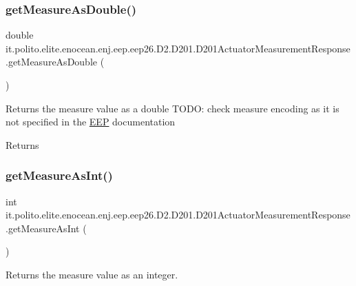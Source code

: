 \subsubsection{\texorpdfstring{get\+Measure\+As\+Double()}{getMeasureAsDouble()}}
{\footnotesize\ttfamily double it.\+polito.\+elite.\+enocean.\+enj.\+eep.\+eep26.\+D2.\+D201.\+D201\+Actuator\+Measurement\+Response.\+get\+Measure\+As\+Double (\begin{DoxyParamCaption}{ }\end{DoxyParamCaption})}

Returns the measure value as a double T\+O\+DO\+: check measure encoding as it is not specified in the \hyperlink{classit_1_1polito_1_1elite_1_1enocean_1_1enj_1_1eep_1_1_e_e_p}{E\+EP} documentation

\begin{DoxyReturn}{Returns}

\end{DoxyReturn}
\hypertarget{classit_1_1polito_1_1elite_1_1enocean_1_1enj_1_1eep_1_1eep26_1_1_d2_1_1_d201_1_1_d201_actuator_measurement_response_ac9c226fb78f0b6fd30a0e4dd7daf32ac}{}\label{classit_1_1polito_1_1elite_1_1enocean_1_1enj_1_1eep_1_1eep26_1_1_d2_1_1_d201_1_1_d201_actuator_measurement_response_ac9c226fb78f0b6fd30a0e4dd7daf32ac} 
\subsubsection{\texorpdfstring{get\+Measure\+As\+Int()}{getMeasureAsInt()}}
{\footnotesize\ttfamily int it.\+polito.\+elite.\+enocean.\+enj.\+eep.\+eep26.\+D2.\+D201.\+D201\+Actuator\+Measurement\+Response.\+get\+Measure\+As\+Int (\begin{DoxyParamCaption}{ }\end{DoxyParamCaption})}

Returns the measure value as an integer.

